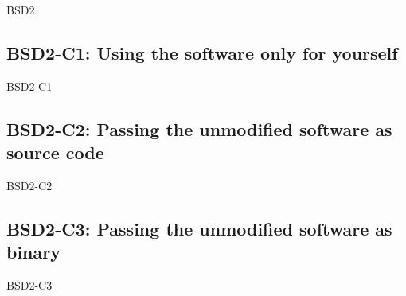 \begin{license}{BSD2}


\subsection{BSD2-C1: Using the software only for yourself}
\begin{lsuc}{BSD2-C1}
  
  \lsucmeans{\useCaseOne} 
  \lsuccovers{\coversOne}

  \begin{lsucrequiresnothing}
  \end{lsucrequiresnothing}

  \lsucprohibitsnothing
\end{lsuc}

\subsection{BSD2-C2: Passing the unmodified software as source code}
\begin{lsuc}{BSD2-C2}

  \lsucmeans{\useCaseTwo}
  \lsuccovers{\coversTwo}

  \begin{lsucrequires}
    \lsucmandatory{\keepLicenseElements}
  \end{lsucrequires}

  \lsucprohibitsnothing
\end{lsuc}

\subsection{BSD2-C3: Passing the unmodified software as binary}
\begin{lsuc}{BSD2-C3}


\end{lsuc}
\end{license}
